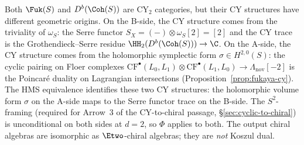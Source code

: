 \begin{remark}
\label{rem:cy-structure-ab-sides}
Both $\Fuk(S)$ and $D^b(\Coh(S))$ are CY$_2$ categories, but their CY structures have different geometric origins. On the B-side, the CY structure comes from the triviality of $\omega_S$: the Serre functor $S_X = (-) \otimes \omega_S[2] = [2]$ and the CY trace is the Grothendieck--Serre residue $\HH_2(D^b(\Coh(S))) \to \C$. On the A-side, the CY structure comes from the holomorphic symplectic form $\sigma \in H^{2,0}(S)$: the cyclic pairing on Floer complexes $\mathrm{CF}^\bullet(L_0, L_1) \otimes \mathrm{CF}^\bullet(L_1, L_0) \to \Lambda_{\mathrm{nov}}[-2]$ is the Poincar\'e duality on Lagrangian intersections (Proposition~\ref{prop:fukaya-cy}). The HMS equivalence identifies these two CY structures: the holomorphic volume form $\sigma$ on the A-side maps to the Serre functor trace on the B-side. The $S^2$-framing (required for Arrow~3 of the CY-to-chiral passage, \S\ref{sec:cyclic-to-chiral}) is unconditional on both sides at $d = 2$, so $\Phi$ applies to both. The output chiral algebras are isomorphic as $\Etwo$-chiral algebras; they are \emph{not} Koszul dual.
\end{remark}

